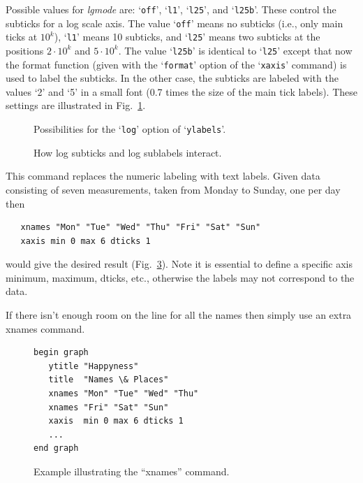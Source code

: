 \begin{commanddescription}
Possible values for {\it lgmode} are: `\texttt{off}', `\texttt{l1}', `\texttt{l25}', and `\texttt{l25b}'. These control the subticks for a log scale axis. The value `\texttt{off}' means no subticks (i.e., only main ticks at $10^k$), `\texttt{l1}' means 10 subticks, and `\texttt{l25}' means two subticks at the positions $2\cdot 10^k$ and $5\cdot 10^k$. The value `\texttt{l25b}' is identical to `\texttt{l25}' except that now the format function (given with the `\texttt{format}' option of the `\texttt{xaxis}' command) is used to label the subticks. In the other case, the subticks are labeled with the values `2' and `5' in a small font (0.7 times the size of the main tick labels). These settings are illustrated in Fig.~\ref{loglab:fig}.

\begin{figure}[tb]
\centering
\mbox{}
\caption{\label{loglab:fig}Possibilities for the `\texttt{log}' option of `\texttt{ylabels}'.}
\end{figure}

\begin{figure}[tb]
\centering
\mbox{}
\caption{\label{logsubt:fig}How log subticks and log sublabels interact.}
\end{figure}

\item[{\sf xnames {\it "name"  "name" ...}}  ]
This command replaces the numeric labeling with text labels. Given data consisting of seven measurements, taken from Monday to Sunday, one per day then

\begin{Verbatim}
   xnames "Mon" "Tue" "Wed" "Thu" "Fri" "Sat" "Sun"
   xaxis min 0 max 6 dticks 1
\end{Verbatim}

would give the desired result (Fig.~\ref{fig:weekday}).  Note it is essential to define a specific axis minimum, maximum, dticks, etc., otherwise the labels may not correspond to the data.

If there isn't enough room on the line for all the names then simply use an extra {\sf xnames} command.

\begin{figure}[tb]
\begin{minipage}[c]{8cm}
\begin{Verbatim}
begin graph
   ytitle "Happyness"
   title  "Names \& Places"
   xnames "Mon" "Tue" "Wed" "Thu"
   xnames "Fri" "Sat" "Sun"
   xaxis  min 0 max 6 dticks 1
   ...
end graph
\end{Verbatim}
\end{minipage}
\hfill
\begin{minipage}[c]{7cm}
\mbox{}
\end{minipage}
\caption{\label{fig:weekday}Example illustrating the ``xnames'' command.}
\end{figure}


\end{commanddescription}
